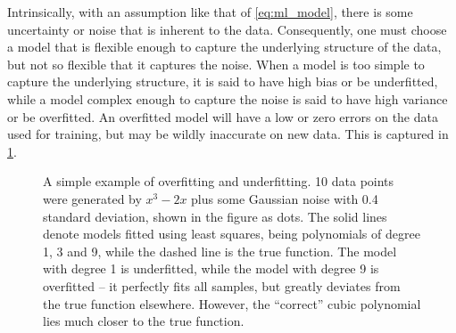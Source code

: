 Intrinsically, with an assumption like that of \cref{eq:ml_model}, there is some uncertainty or noise that is inherent to the data.
Consequently, one must choose a model that is flexible enough to capture the underlying structure of the data, but not so flexible that it captures the noise.
When a model is too simple to capture the underlying structure, it is said to have high bias or be underfitted, while a model complex enough to capture the noise is said to have high variance or be overfitted.
An overfitted model will have a low or zero errors on the data used for training, but may be wildly inaccurate on new data.
This is captured in \cref{fig:over_under_fit}.

\begin{figure}
	\centering
	\caption{
		A simple example of overfitting and underfitting.
		10 data points were generated by $x^3-2x$ plus some Gaussian noise with 0.4 standard deviation, shown in the figure as dots.
		The solid lines denote models fitted using least squares, being polynomials of degree 1, 3 and 9, while the dashed line is the true function.
		The model with degree 1 is underfitted, while the model with degree 9 is overfitted -- it perfectly fits all samples, but greatly deviates from the true function elsewhere.
		However, the \enquote{correct} cubic polynomial lies much closer to the true function.}
	\label{fig:over_under_fit}
\end{figure}

